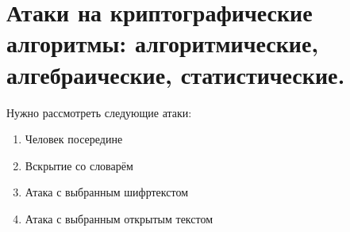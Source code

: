 \section{Атаки на криптографические алгоритмы: алгоритмические, алгебраические, статистические.}

Нужно рассмотреть следующие атаки:

\begin{enumerate}
	\item Человек посередине
	\item Вскрытие со словарём
	\item Атака с выбранным шифртекстом
	\item Атака с выбранным открытым текстом
\end{enumerate}
